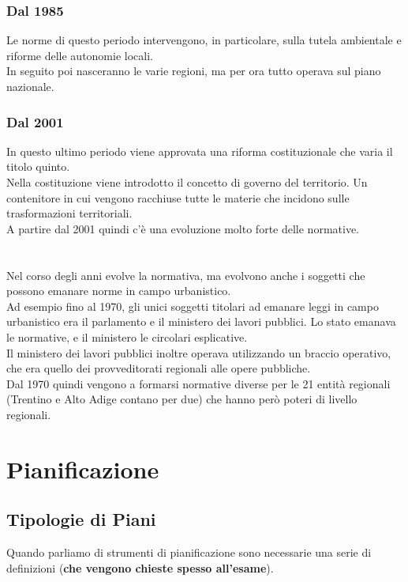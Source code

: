 \documentclass[a4paper,12pt, oneside]{book}
\begin{document}
\subsection{Dal 1985}
Le norme di questo periodo intervengono, in particolare, sulla tutela ambientale e riforme delle autonomie locali.\\
In seguito poi nasceranno le varie regioni, ma per ora tutto operava sul piano nazionale.\\
\subsection{Dal 2001}
In questo ultimo periodo viene approvata una riforma costituzionale che varia il titolo quinto.\\
Nella costituzione viene introdotto il concetto di governo del territorio. Un contenitore in cui vengono racchiuse tutte le materie che incidono sulle trasformazioni territoriali.\\
A partire dal 2001 quindi c'è una evoluzione molto forte delle normative.\\
\\
\\
Nel corso degli anni evolve la normativa, ma evolvono anche i soggetti che possono emanare norme in campo urbanistico.\\
Ad esempio fino al 1970, gli unici soggetti titolari ad emanare leggi in campo urbanistico era il parlamento e il ministero dei lavori pubblici. Lo stato emanava le normative, e il ministero le circolari esplicative.\\
Il ministero dei lavori pubblici inoltre operava utilizzando un braccio operativo, che era quello dei provveditorati regionali alle opere pubbliche.\\
Dal 1970 quindi vengono a formarsi normative diverse per le 21 entità regionali (Trentino e Alto Adige contano per due) che hanno però poteri di livello regionali.\\
\chapter{Pianificazione}
\section{Tipologie di Piani}
Quando parliamo di strumenti di pianificazione sono necessarie una serie di definizioni (\textbf{che vengono chieste spesso all'esame}).\\
\end{document}
